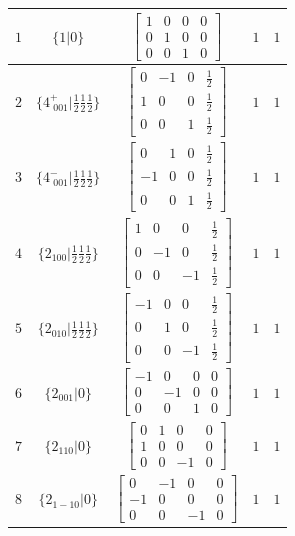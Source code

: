 \documentclass[fleqn,8pt]{jsarticle}
\begin{document}
\begin{longtable}{ccccc}
$ 1 $ & $ \{1|0\} $ & $ \begin{bmatrix} 1 & 0 & 0 & 0 \\ 0 & 1 & 0 & 0 \\ 0 & 0 & 1 & 0 \end{bmatrix} $ & $ 1 $ & $ 1 $ \\ \hline
$ 2 $ & $ \{4^{+}_{\,\,001}|\frac{1}{2} \frac{1}{2} \frac{1}{2}\} $ & $ \begin{bmatrix} 0 & -1 & 0 & \frac{1}{2} \\ 1 & 0 & 0 & \frac{1}{2} \\ 0 & 0 & 1 & \frac{1}{2} \end{bmatrix} $ & $ 1 $ & $ 1 $ \\ \hline
$ 3 $ & $ \{4^{-}_{\,\,001}|\frac{1}{2} \frac{1}{2} \frac{1}{2}\} $ & $ \begin{bmatrix} 0 & 1 & 0 & \frac{1}{2} \\ -1 & 0 & 0 & \frac{1}{2} \\ 0 & 0 & 1 & \frac{1}{2} \end{bmatrix} $ & $ 1 $ & $ 1 $ \\ \hline
$ 4 $ & $ \{2{}_{100}|\frac{1}{2} \frac{1}{2} \frac{1}{2}\} $ & $ \begin{bmatrix} 1 & 0 & 0 & \frac{1}{2} \\ 0 & -1 & 0 & \frac{1}{2} \\ 0 & 0 & -1 & \frac{1}{2} \end{bmatrix} $ & $ 1 $ & $ 1 $ \\ \hline
$ 5 $ & $ \{2{}_{010}|\frac{1}{2} \frac{1}{2} \frac{1}{2}\} $ & $ \begin{bmatrix} -1 & 0 & 0 & \frac{1}{2} \\ 0 & 1 & 0 & \frac{1}{2} \\ 0 & 0 & -1 & \frac{1}{2} \end{bmatrix} $ & $ 1 $ & $ 1 $ \\ \hline
$ 6 $ & $ \{2{}_{001}|0\} $ & $ \begin{bmatrix} -1 & 0 & 0 & 0 \\ 0 & -1 & 0 & 0 \\ 0 & 0 & 1 & 0 \end{bmatrix} $ & $ 1 $ & $ 1 $ \\ \hline
$ 7 $ & $ \{2{}_{110}|0\} $ & $ \begin{bmatrix} 0 & 1 & 0 & 0 \\ 1 & 0 & 0 & 0 \\ 0 & 0 & -1 & 0 \end{bmatrix} $ & $ 1 $ & $ 1 $ \\ \hline
$ 8 $ & $ \{2{}_{1-10}|0\} $ & $ \begin{bmatrix} 0 & -1 & 0 & 0 \\ -1 & 0 & 0 & 0 \\ 0 & 0 & -1 & 0 \end{bmatrix} $ & $ 1 $ & $ 1 $ \\
\end{longtable}
\end{document}
